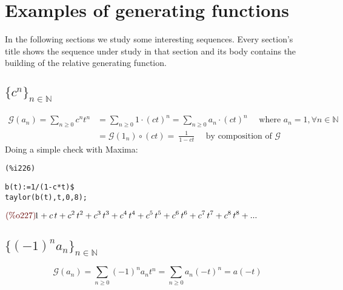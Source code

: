 
\section{Examples of generating functions}

In the following sections we study some interesting sequences. Every
section's title shows the sequence under study in that section and its
body contains the building of the relative generating function.

\subsection{$\{c^n\}_{n\in \mathbb{N} }$}
\begin{displaymath}
  \begin{split}
    \mathcal{G} (a_n) = \sum_{n \geq 0}{c^n t^n} &= \sum_{n \geq
      0}{1\cdot (ct)^n} = \sum_{n \geq 0}{a_n \cdot (ct)^n} \quad
    \text{ where } a_n = 1, \forall n \in \mathbb{N} \\
    &= \mathcal{G} (1_n) \circ (ct) = \ \frac{1}{1-ct} \quad \text{ by
    composition of } \mathcal{G} 
  \end{split}
\end{displaymath}
Doing a simple check with Maxima:

\noindent
\begin{minipage}[t]{8ex}{\color{red}\bf
\begin{verbatim}
(%i226) 
\end{verbatim}}
\end{minipage}
\begin{minipage}[t]{\textwidth}{\color{blue}
\begin{verbatim}
b(t):=1/(1-c*t)$
taylor(b(t),t,0,8);
\end{verbatim}}
\end{minipage}
\begin{math}\displaystyle
\parbox{8ex}{\color{labelcolor}(\%o227) }
1+c\,t+{c}^{2}\,{t}^{2}+{c}^{3}\,{t}^{3}+{c}^{4}\,{t}^{4}+{c}^{5}\,{t}^{5}+{c}^{6}\,{t}^{6}+{c}^{7}\,{t}^{7}+{c}^{8}\,{t}^{8}+...
\end{math}

\subsection{$\{(-1)^n a_n\}_{n\in \mathbb{N} }$}
\begin{displaymath}
    \mathcal{G} (a_n) = \sum_{n \geq 0}{(-1)^n a_n t^n} = \sum_{n \geq
      0}{a_n (-t)^n} = a(-t)
\end{displaymath}

